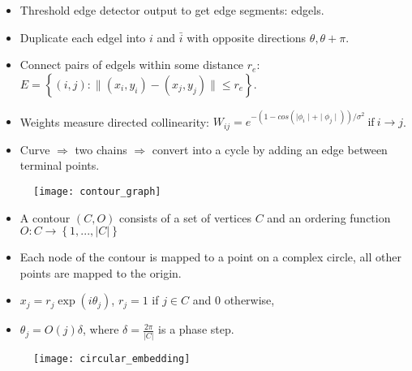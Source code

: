 \documentclass[11pt, a4paper, landscape]{article}
\begin{document}
\NewPage{}
\vfill
\begin{itemize}
\item Threshold edge detector output to get edge segments: edgels.
\item Duplicate each edgel into $i$ and $\bar{i}$ with opposite directions $\theta, \theta + \pi$.
\item Connect pairs of edgels within some distance $r_e$: $E = \left\lbrace (i, j) : \| (x_i, y_i) - (x_j, y_j) \| \leq r_e \right\rbrace $.
\item Weights measure directed collinearity: $W_{ij} = e^{-(1 - cos(\mid \phi_i \mid + \mid \phi_j \mid))/\sigma^2}\ \mathrm{if}\ i \rightarrow j$.
\item Curve $\Rightarrow$ two chains $\Rightarrow$ convert into a cycle by adding an edge between terminal points.
\end{itemize}
\begin{figure}
	\centering
	\texttt{[image: contour\_graph]}
\end{figure}
\vfill


\NewPage{}
\vfill
\begin{itemize}
\item A contour $(C, O)$ consists of a set of vertices $C$ and an ordering function $O: C \rightarrow \left\lbrace 1, ..., \lvert C \rvert \right\rbrace $
\item Each node of the contour is mapped to a point on a complex circle, all other points are mapped to the origin.
\item $x_j = r_j\exp(i\theta_j)$, $r_j = 1$ if $j \in C$ and 0 otherwise,
\item $\theta_j = O(j)\delta$, where $\delta = \frac{2\pi}{\lvert C \rvert}$ is a phase step.
\end{itemize}
\begin{figure}
	\centering
	\texttt{[image: circular\_embedding]}
\end{figure}
\vfill
\end{document}
